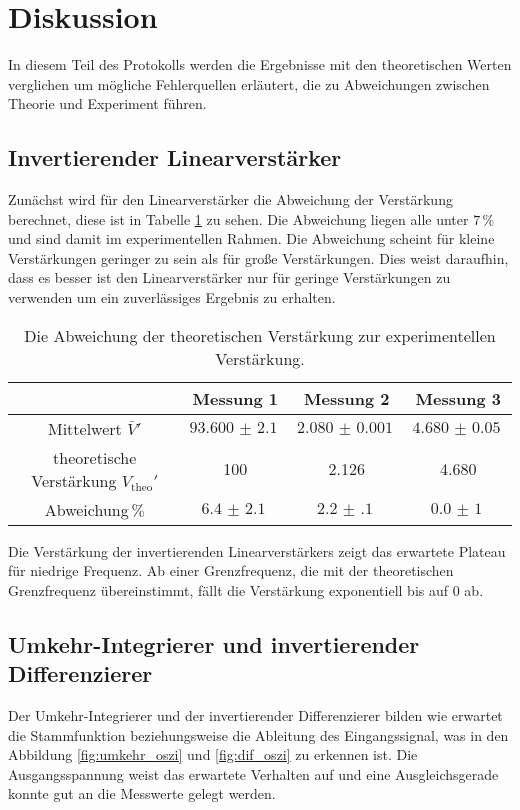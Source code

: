 \newpage
\section{Diskussion}
\label{sec:diskussion}
In diesem Teil des Protokolls werden die Ergebnisse mit den theoretischen Werten verglichen um mögliche Fehlerquellen erläutert, die zu Abweichungen zwischen Theorie und Experiment führen.
\subsection{Invertierender Linearverstärker}
Zunächst wird für den Linearverstärker die Abweichung der Verstärkung berechnet, diese ist in Tabelle \ref{tab:lin_disk} zu sehen.
Die Abweichung liegen alle unter $7\,\%$ und sind damit im experimentellen Rahmen.
Die Abweichung scheint für kleine Verstärkungen geringer zu sein als für große Verstärkungen.
Dies weist daraufhin, dass es besser ist den Linearverstärker nur für geringe Verstärkungen zu verwenden um ein zuverlässiges Ergebnis zu erhalten.
\begin{table}[H]
    \centering
    \begin{tabular}{cccc}
        \toprule
        &Messung 1 & Messung 2 & Messung 3\\
        \midrule
        Mittelwert $\bar{V}'$ & $\SI{93.600(2100)}{}$ &  $\SI{2.080(1)}{} $&  $\SI{4.680(50)}{} $ \\
        theoretische Verstärkung $V_\text{theo}'$ & 100 & 2.126 & 4.680 \\
        Abweichung$\,\%$ & $\SI{6.4(21)}{} $& $\SI{2.2(1)}{}$ & $\SI{0.0(10)}{}$ \\
        \bottomrule
    \end{tabular}
    \caption{Die Abweichung der theoretischen Verstärkung zur experimentellen Verstärkung.}
    \label{tab:lin_disk}
\end{table}
Die Verstärkung der invertierenden Linearverstärkers zeigt das erwartete Plateau für niedrige Frequenz.
Ab einer Grenzfrequenz, die mit der theoretischen Grenzfrequenz übereinstimmt, fällt die Verstärkung exponentiell bis auf 0 ab.
\subsection{Umkehr-Integrierer und invertierender Differenzierer}
Der Umkehr-Integrierer und der invertierender Differenzierer bilden wie erwartet die Stammfunktion beziehungsweise die Ableitung des Eingangssignal, was in den Abbildung \ref{fig:umkehr_oszi} und \ref{fig:dif_oszi} zu erkennen ist.
Die Ausgangsspannung weist das erwartete Verhalten auf und eine Ausgleichsgerade konnte gut an die Messwerte gelegt werden.
